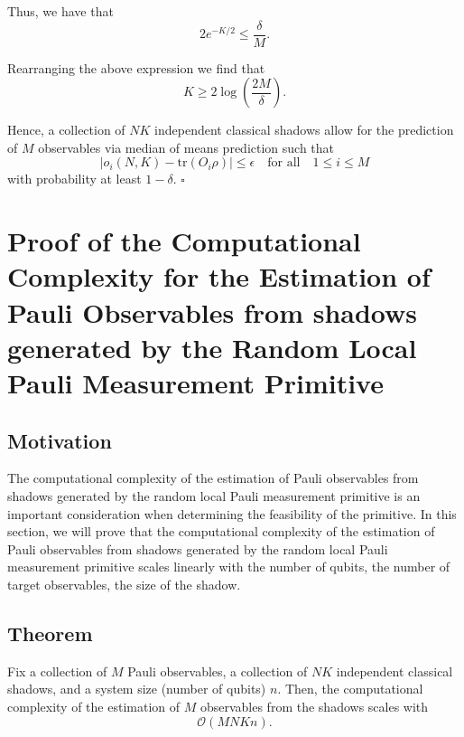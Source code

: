 \documentclass[12pt]{article}
\begin{document}
    Thus, we have that
    \begin{equation*}
        2e^{-K/2} \leq \frac{\delta}{M}.
    \end{equation*}

    Rearranging the above expression we find that
    \begin{equation*}
        K \geq 2\log{\left(\frac{2M}{\delta}\right)}.
    \end{equation*}

    Hence, a collection of $NK$ independent classical shadows allow for the prediction of $M$ observables via median of means prediction such that
    \begin{equation*}
        |\hat{o}_i(N,K) - \text{tr}(O_i\rho)| \leq \epsilon \quad \text{for all} \quad 1 \leq i \leq M
    \end{equation*}
    with probability at least $1-\delta$.
    \hfill $\square$

    \section{Proof of the Computational Complexity for the Estimation of Pauli Observables from shadows generated by the Random Local Pauli Measurement Primitive}
    \subsection{Motivation}
    The computational complexity of the estimation of Pauli observables from shadows generated by the random local Pauli measurement primitive is an important consideration when determining the feasibility of the primitive. In this section, we will prove that the computational complexity of the estimation of Pauli observables from shadows generated by the random local Pauli measurement primitive scales linearly with the number of qubits, the number of target observables, the size of the shadow.

    \subsection{Theorem}
    Fix a collection of $M$ Pauli observables, a collection of $NK$ independent classical shadows, and a system size (number of qubits) $n$. Then, the computational complexity of the estimation of $M$ observables from the shadows scales with
    \begin{equation*}
        \mathcal{O}\left(MNKn\right).
    \end{equation*}
\end{document}
